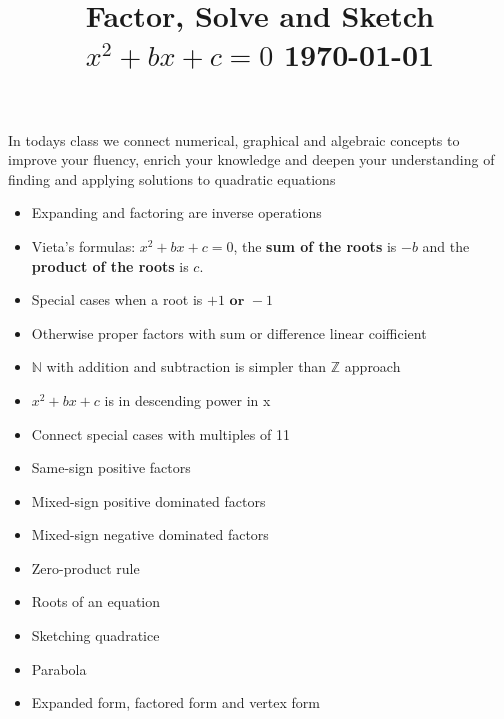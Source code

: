 \documentclass[12pt, a4paper, addpoints]{exam}
\title{Factor, Solve and Sketch  $x^2+bx+c=0$ \dayofweekname{\day}{\month}{\year} \today}
\date{}
\begin{document}
\maketitle

\vspace{-18mm}
\noindent 
In todays class we connect  numerical, graphical and algebraic concepts to improve your fluency, enrich  your knowledge and deepen your understanding of finding and applying solutions to quadratic equations
\begin{questions}



\begin{mdframed}[backgroundcolor=gray!10] %
\scriptsize
\setlength{\columnsep}{2pt}
\begin{multicols}{4}
\begin{itemize}
\item  Expanding and factoring are inverse operations
\item Vieta's formulas: $x^2 + bx + c = 0$, the \textbf{sum of the roots} is $-b$ and the \textbf{product of the roots} is $c$.
\item Special cases when a   root is \(+ 1  \textbf{ or } -1\)
\item Otherwise proper factors with  sum or difference linear coifficient
\item   $\mathbb{N}$ with addition and subtraction
is simpler than  $\mathbb{Z}$ approach
\item \(  x^2 + bx + c \)  is in descending power in x
\item Connect special cases with multiples of 11
    \item Same-sign positive factors
    \item Mixed-sign positive dominated factors
   \item Mixed-sign negative dominated factors
    \item Zero-product rule
    \item Roots of an equation
    \item Sketching quadratice
    \item Parabola
    \item Expanded form, factored form and vertex form
\end{itemize}
\end{multicols}




\end{mdframed}
\end{questions}
\end{document}
